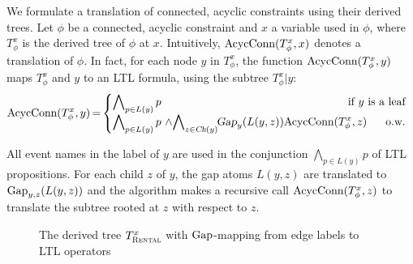 We formulate a translation of connected, acyclic constraints
using their derived trees.
Let $\phi$ be a connected, acyclic constraint
and $x$ a variable used in $\phi$,
where $T_\phi^x$ is the derived tree of $\phi$ at $x$.
Intuitively, $\text{AcycConn}(T_\phi^x,x)$ 
denotes a translation of $\phi$.
In fact,
for each node $y$ in $T_\phi^x$, 
the function $\text{AcycConn}(T_\phi^x,y)$
maps $T_\phi^x$ and $y$ to an LTL formula,
using the subtree $T_\phi^x|y$:
$$
\AcycConn(T_\phi^x,y)\tight=
\!\left\{\def\arraystretch{1.25}
\begin{array}{@{}l@{~~}l}\displaystyle
  {\bigwedge}_{p\in L(y)\,} p
  \hfill \mbox{if $y$ is a leaf}
  \\\displaystyle
  {\bigwedge}_{p\in L(y)\,} p~{\land}
  {\bigwedge}_{z \in \textsl{Ch}(y)} \!\textsl{\Gap}_y(L(y,z)) 
    \AcycConn(T_{\phi}^{x},z)~~~~~
  \hfill \mbox{o.w.}
  \end{array}\right.
$$
  
All event names in the label of $y$
are used in the conjunction $\bigwedge_{p\in L(y)}\!p$
of LTL propositions.
For each child $z$ of $y$,
the gap atoms $L(y,z)$
are translated to $\text{Gap}_{y,z}(L(y,z))$
and
the algorithm makes a recursive call $\text{AcycConn}(T_{\phi}^x,z)$
to translate the subtree rooted at $z$ with respect to $z$.

  \begin{figure}[h]\centering
  \caption{The derived tree $T_{\textsc{Rental}}^{x}$ with $\text{Gap}$-mapping from edge labels to LTL operators}
  \label{fig:second-graph}
  \end{figure}
  

